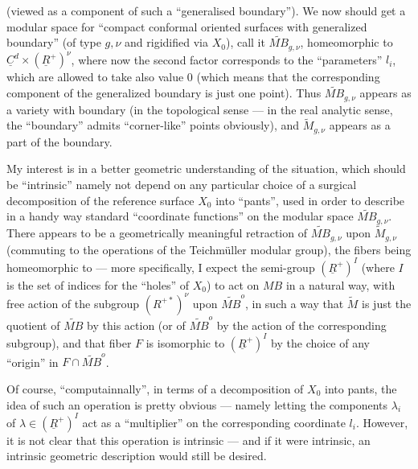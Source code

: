 \documentclass[11pt,a4paper]{article}
\begin{document}
(viewed as a component of such a “generalised boundary”). We now should
 get a modular space for “compact conformal oriented surfaces
with generalized boundary” (of type $g,\nu$ and rigidified via $X_{0}$), call
it $\widetilde{MB}_{g,\nu}$, homeomorphic to
$\underline{C}^{d} \times (\underline{R}^{+})^{\nu}$, where now the second
factor corresponds to the “parameters” $l_{i}$, which are allowed to take also
value 0 (which means that the corresponding component of the generalized
boundary is just one point). Thus $\widetilde{MB}_{g,\nu}$ appears as a
variety with boundary (in the topological sense — in the real analytic sense,
the “boundary” admits “corner-like” points obviously), and
$\widetilde{M}_{g,\nu}$ appears as a part of the boundary.

My interest is in a better geometric understanding of the situation, which
should be “intrinsic” namely not depend on any particular choice of a
surgical decomposition of the reference surface $X_{0}$ into “pants”, used in
order to describe in a handy way  standard “coordinate functions”
on the modular space $\widetilde{MB}_{g,\nu}$. There appears to be a
geometrically meaningful retraction of $\widetilde{MB}_{g,\nu}$ upon
$\widetilde{M}_{g,\nu}$ (commuting to the operations of the Teichmüller
modular group), the fibers being homeomorphic to
 — more specifically, I expect the
semi-group $(\underline{R}^{+})^{I}$ (where $I$ is the set of indices for the
“holes” of $X_{0}$) to act on $MB$ in a natural way, with free action of the
subgroup $(R^{+*})^{\nu}$ upon $\widetilde{MB}^{o}$, in such a way that
$\widetilde{M}$ is just the quotient of $\widetilde{MB}$ by this action (or of
$\widetilde{MB}^{o}$ by the action of the \struck{\ill{}} corresponding
subgroup), and that  fiber $F$ is isomorphic to
$(\underline{R}^{+})^{I}$ by the choice of any “origin” in
$F \cap \widetilde{MB}^{o}$.

Of course, “computainnally”, in terms of a decomposition of $X_{0}$ into
pants, the idea of such an operation is pretty obvious — namely letting the
components $\lambda_{i}$ of $\lambda \in (\underline{R}^{+})^{I}$ act as a
“multiplier” on the corresponding coordinate $l_{i}$. However, it is not
clear that this operation is intrinsic — and if it were intrinsic, an
intrinsic geometric description would still be \struck{\ill{}} desired.
\end{document}
